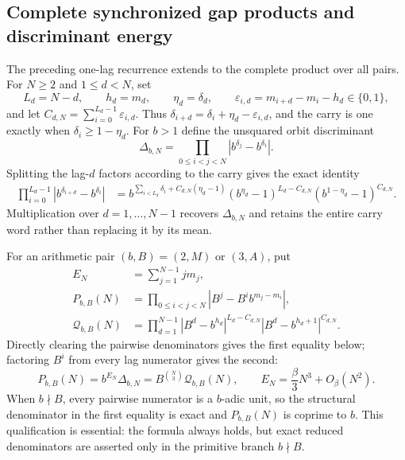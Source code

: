 \documentclass[11pt,oneside]{article}
\theoremstyle{definition}
\theoremstyle{remark}
\begin{document}
\subsection{Complete synchronized gap products and discriminant energy}
\label{sturmian:gap-discriminants}

The preceding one-lag recurrence extends to the complete product over all pairs.  For
$N\ge2$ and $1\le d<N$, set
\[
 L_d=N-d,\qquad h_d=m_d,\qquad \eta_d=\delta_d,
 \qquad \varepsilon_{i,d}=m_{i+d}-m_i-h_d\in\{0,1\},
\]
and let $C_{d,N}=\sum_{i=0}^{L_d-1}\varepsilon_{i,d}$.  Thus
$\delta_{i+d}=\delta_i+\eta_d-\varepsilon_{i,d}$, and the carry is one exactly when
$\delta_i\ge1-\eta_d$.  For $b>1$ define the unsquared orbit discriminant
\begin{equation}
 \Delta_{b,N}=\prod_{0\le i<j<N}|b^{\delta_j}-b^{\delta_i}|.
 \label{sturmian:eq-orbit-discriminant}
\end{equation}
Splitting the lag-$d$ factors according to the carry gives the exact identity
\begin{align}
 \prod_{i=0}^{L_d-1}|b^{\delta_{i+d}}-b^{\delta_i}|
 &={}
 b^{\sum_{i<L_d}\delta_i+C_{d,N}(\eta_d-1)}
 (b^{\eta_d}-1)^{L_d-C_{d,N}}
 (b^{1-\eta_d}-1)^{C_{d,N}}.
 \label{sturmian:eq-lag-product}
\end{align}
Multiplication over $d=1,\ldots,N-1$ recovers $\Delta_{b,N}$ and retains the entire carry
word rather than replacing it by its mean.

For an arithmetic pair $(b,B)=(2,M)$ or $(3,A)$, put
\begin{align}
 E_N&=\sum_{j=1}^{N-1}j m_j,\nonumber\\
 P_{b,B}(N)&=\prod_{0\le i<j<N}|B^j-B^i b^{m_j-m_i}|,\nonumber\\
 \mathcal Q_{b,B}(N)&=
 \prod_{d=1}^{N-1}|B^d-b^{h_d}|^{L_d-C_{d,N}}
 |B^d-b^{h_d+1}|^{C_{d,N}}.
 \label{sturmian:eq-cleared-gap-products}
\end{align}
Directly clearing the pairwise denominators gives the first equality below; factoring $B^i$
from every lag numerator gives the second:
\begin{equation}
 P_{b,B}(N)=b^{E_N}\Delta_{b,N}
 =B^{\binom N3}\mathcal Q_{b,B}(N),
 \qquad
 E_N=\frac{\beta}{3}N^3+O_\beta(N^2).
 \label{sturmian:eq-gap-factorization}
\end{equation}
When $b\nmid B$, every pairwise numerator is a $b$-adic unit, so the structural denominator
in the first equality is exact and $P_{b,B}(N)$ is coprime to $b$.  This qualification is
essential: the formula always holds, but exact reduced denominators are asserted only in the
primitive branch $b\nmid B$.
\end{document}
